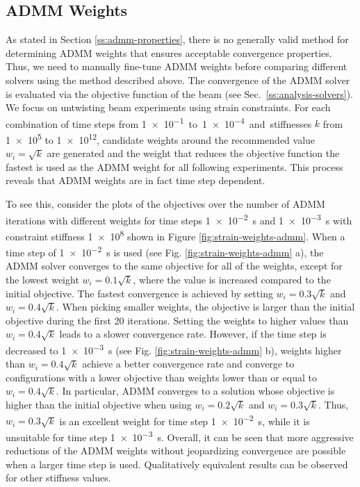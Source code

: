 \subsection{ADMM Weights}\label{ss:admm-weights}
As stated in Section \ref{ss:admm-properties}, there is no generally valid method for determining ADMM weights that ensures acceptable convergence properties.
Thus, we need to manually fine-tune ADMM weights before comparing different solvers using the method described above. The convergence of the ADMM solver is evaluated via 
the objective function of the beam (see Sec.\ \ref{ss:analysis-solvers}). We focus on untwisting beam experiments using strain constraints. For 
each combination of time steps from \SI{1e-1} to \SI{1e-4} and stiffnesses $k$ from \num{1e5} to \num{1e12}, candidate weights around the recommended value $w_i = \sqrt{k}$ 
are generated and the weight that reduces the objective function the fastest is used as the ADMM weight for all following experiments. 
This process reveals that ADMM weights are in fact time step dependent.

To see this, consider the plots of the objectives over the number of ADMM iterations with different weights for time steps \SI{1e-2}{\second} and 
\SI{1e-3}{\second} with constraint stiffness \num{1e8} shown in Figure \ref{fig:strain-weights-admm}. When a time step 
of \SI{1e-2}{\second} is used (see Fig. \ref{fig:strain-weights-admm} a), the ADMM solver converges to the same objective for all of the weights, except for the 
lowest weight $w_i = 0.1\sqrt{k}$, where the value is increased compared to the initial objective. The fastest convergence is achieved by setting $w_i = 0.3\sqrt{k}$ and 
$w_i = 0.4\sqrt{k}$. When picking smaller weights, the objective is larger than the initial objective during the first 20 iterations. Setting the weights to 
higher values than $w_i = 0.4\sqrt{k}$ leads to a slower convergence rate. However, if the time step is decreased to \SI{1e-3}{\second} (see Fig. \ref{fig:strain-weights-admm} b), 
weights higher than $w_i = 0.4\sqrt{k}$ achieve a better convergence rate and converge to configurations with a lower objective than weights lower than 
or equal to $w_i = 0.4\sqrt{k}$. In particular, ADMM converges to a solution whose objective is higher than the initial objective when using $w_i = 0.2\sqrt{k}$ and 
$w_i = 0.3\sqrt{k}$. Thus, $w_i = 0.3\sqrt{k}$ is an excellent weight for time step \SI{1e-2}{\second}, while it is unsuitable for time step \SI{1e-3}{\second}. Overall, it 
can be seen that more aggressive reductions of the ADMM weights without jeopardizing convergence are possible when a larger time step is used. Qualitatively equivalent results 
can be observed for other stiffness values. 

